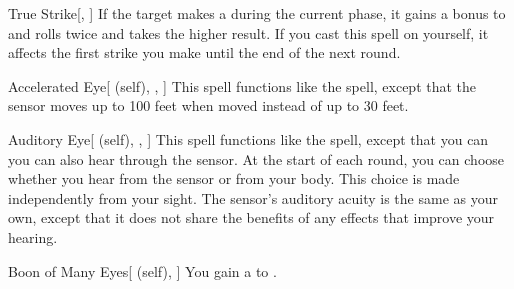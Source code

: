\lowercase{\hypertarget{spell:True Strike}{}}\label{spell:True Strike}
\begin{freeability}[Rank 1]{\hypertarget{spell:True Strike}{True Strike}}[, ]
If the target makes a  during the current phase,
it gains a  bonus to  and rolls twice and takes the higher result.
If you cast this spell on yourself, it affects the first strike you make until the end of the next round.
\end{freeability}
\vspace{0.25em}



\lowercase{\hypertarget{spell:Accelerated Eye}{}}\label{spell:Accelerated Eye}
\begin{attuneability}[Rank 3]{\hypertarget{spell:Accelerated Eye}{Accelerated Eye}}[ (self), , ]
This spell functions like the  spell, except that the sensor moves up to 100 feet when moved instead of up to 30 feet.
\end{attuneability}
\vspace{0.25em}



\lowercase{\hypertarget{spell:Auditory Eye}{}}\label{spell:Auditory Eye}
\begin{attuneability}[Rank 3]{\hypertarget{spell:Auditory Eye}{Auditory Eye}}[ (self), , ]
This spell functions like the  spell, except that you can you can also hear through the sensor.
At the start of each round, you can choose whether you hear from the sensor or from your body.
This choice is made independently from your sight.
The sensor's auditory acuity is the same as your own, except that it does not share the benefits of any  effects that improve your hearing.
\end{attuneability}
\vspace{0.25em}



\lowercase{\hypertarget{spell:Boon of Many Eyes}{}}\label{spell:Boon of Many Eyes}
\begin{attuneability}[Rank 3]{\hypertarget{spell:Boon of Many Eyes}{Boon of Many Eyes}}[ (self), ]
You gain a   to .
\end{attuneability}
\vspace{0.25em}



